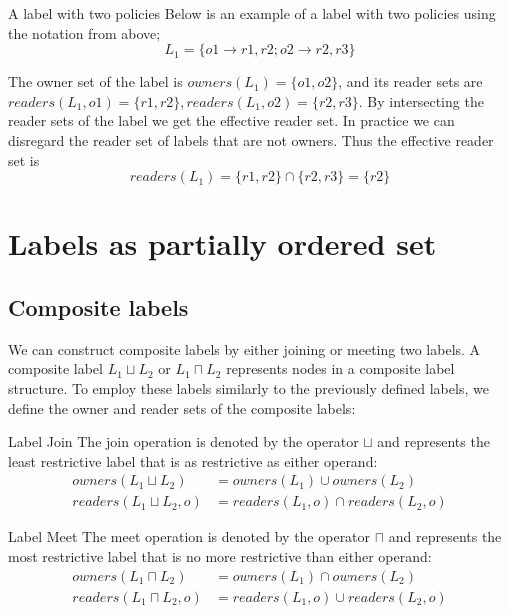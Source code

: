 \begin{example}{A label with two policies}\label{dlm:ex:simple_label}
  Below is an example of a label with two policies using the notation from above;
  $$L_1 = \{o1 \rightarrow r1, r2; o2 \rightarrow r2, r3\}$$

  The owner set of the label is $owners(L_1) = \{o1, o2\}$, and its reader sets are $readers(L_1, o1) = \{r1, r2\}, readers(L_1, o2) = \{r2, r3\}$.
  By intersecting the reader sets of the label we get the effective reader set.
  In practice we can disregard the reader set of labels that are not owners.
  Thus the effective reader set is
  $$readers(L_1) = \{r1,r2\} \cap \{r2, r3\} = \{r2\}$$
\end{example}

\section{Labels as partially ordered set}

\subsection{Composite labels}
We can construct composite labels by either joining or meeting two labels.
A composite label $L_1 \sqcup L_2$ or $L_1 \sqcap L_2$ represents nodes in a composite label structure.
To employ these labels similarly to the previously defined labels, we define the owner and reader sets of the composite labels:

\begin{definition}{Label Join}\label{dlm:def:join}
The join operation is denoted by the operator $\sqcup$ and represents the least restrictive label that is as restrictive as either operand:
  \begin{align*}
    owners(L_1 \sqcup L_2) &= owners(L_1) \cup owners(L_2) \\
    readers(L_1 \sqcup L_2, o) &= readers(L_1, o) \cap readers(L_2, o)
  \end{align*}
\end{definition}
\begin{definition}{Label Meet}\label{dlm:def:meet}
The meet operation is denoted by the operator $\sqcap$ and represents the most restrictive label that is no more restrictive than either operand:
  \begin{align*}
    owners(L_1 \sqcap L_2) &= owners(L_1) \cap owners(L_2) \\
    readers(L_1 \sqcap L_2, o) &= readers(L_1, o) \cup readers(L_2, o)
  \end{align*}
\end{definition}

